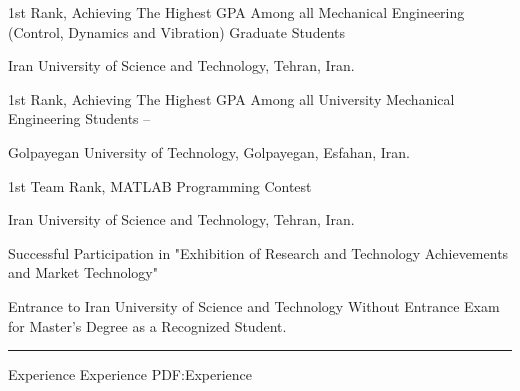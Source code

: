 \documentclass[a4paper,MMMyyyy,nonstopmode]{ResumeTemplate}
\begin{document}
\begin{Body}
\Gap
\vspace{5pt}
\BulletItem
1st Rank, Achieving The Highest GPA Among all Mechanical Engineering (Control, Dynamics and Vibration) Graduate Students
\hfill
{}
\begin{Detail}
	\Item
	Iran University of Science and Technology, Tehran, Iran.
\end{Detail}

\Gap
\vspace{5pt}
\BulletItem
1st Rank, Achieving The Highest GPA Among all University Mechanical Engineering Students
\hfill
{} -- 
\begin{Detail}
	\Item
	Golpayegan University of Technology, Golpayegan, Esfahan, Iran.
\end{Detail}

\Gap
\vspace{5pt}
\BulletItem
1st Team Rank, MATLAB Programming Contest
\hfill
{}
\begin{Detail}
\Item
Iran University of Science and Technology, Tehran, Iran.
\end{Detail}

\Gap
\vspace{5pt}
\BulletItem
Successful Participation in "Exhibition of Research and Technology Achievements and Market Technology"
\hfill
{}

\Gap
\vspace{5pt}
\BulletItem
Entrance to Iran University of Science and Technology Without Entrance Exam for Master's Degree as a Recognized Student.
\hfill
{}



\textcolor{Forestg}{\hrule height 0.1cm}

\Section
{Experience}
{Experience}
{PDF:Experience}


\end{Body}
\end{document}
